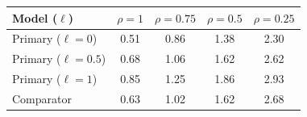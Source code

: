 \begin{tabular}{lcccc}
\toprule
Model ($\ell$) & $\rho=1$ & $\rho=0.75$ & $\rho=0.5$ & $\rho=0.25$ \\
\midrule
Primary ($\ell=0$) & 0.51 & 0.86 & 1.38 & 2.30 \\
Primary ($\ell=0.5$) & 0.68 & 1.06 & 1.62 & 2.62 \\
Primary ($\ell=1$) & 0.85 & 1.25 & 1.86 & 2.93 \\
Comparator & 0.63 & 1.02 & 1.62 & 2.68 \\
\bottomrule
\end{tabular}
